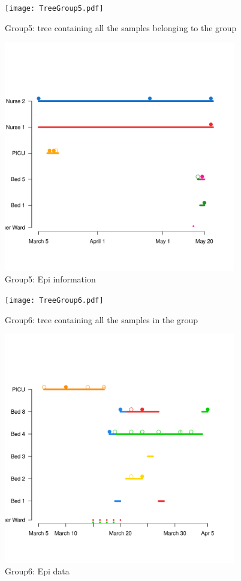 \documentclass[12pt,a4paper]{article}
\begin{document}
\begin{figure}[!ht]
 \centering
  \texttt{[image: TreeGroup5.pdf]}
  \caption{Group5: tree containing all the samples belonging to the group}\label{Group5Tree}
\end{figure}

\begin{figure}[!ht]
  \centering
  \includegraphics[width=0.9\textwidth]{Group5_Beds.pdf}
  \caption{Group5: Epi information}\label{Group5Beds}
\end{figure}

\begin{figure}[!ht]
  \centering
       \texttt{[image: TreeGroup6.pdf]}
  \caption{Group6: tree containing all the samples in the group}\label{Group6Tree}
\end{figure}


\begin{figure}[!ht]
  \centering
       \includegraphics[width=0.9\textwidth]{Group6_Beds.pdf}
  \caption{Group6: Epi data}\label{Group6Beds}
\end{figure}
\end{document}
